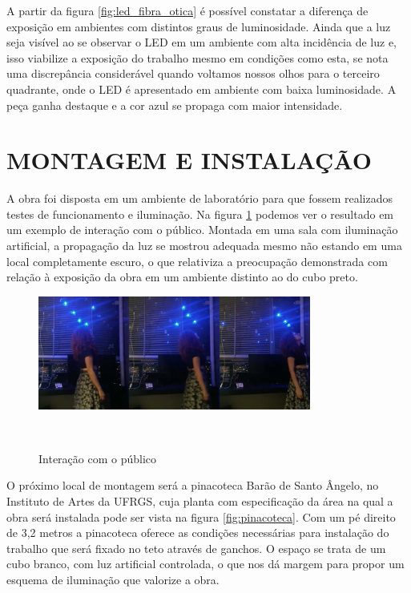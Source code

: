 A partir da figura \ref{fig:led_fibra_otica} é possível constatar a diferença de exposição em ambientes com distintos graus de luminosidade. Ainda que a luz seja visível ao se observar o LED em um ambiente com alta incidência de luz e, isso viabilize a exposição do trabalho mesmo em condições como esta, se nota uma discrepância considerável quando voltamos nossos olhos para o terceiro quadrante, onde o LED é apresentado em ambiente com baixa luminosidade. A peça ganha destaque e a cor azul se propaga com maior intensidade.

\section{MONTAGEM E INSTALAÇÃO}

A obra foi disposta em um ambiente de laboratório para que fossem realizados testes de funcionamento e iluminação. Na figura \ref{fig:trabalho} podemos ver o resultado em um exemplo de interação com o público. Montada em uma sala com iluminação artificial, a propagação da luz se mostrou adequada mesmo não estando em uma local completamente escuro, o que relativiza a preocupação demonstrada com relação à exposição da obra em um ambiente distinto ao do cubo preto.  
   
\begin{figure}[H]
  \begin{center}
    \caption{Interação com o público}
    \vspace*{0,2cm}
    \includegraphics[width=0.8\textwidth]{./04-figuras/trabalho}
    \label{fig:trabalho}
  \end{center}
  \vspace*{-0,9cm}
  \\
\end{figure}

O próximo local de montagem será a pinacoteca Barão de Santo Ângelo, no Instituto de Artes da UFRGS, cuja planta com especificação da área na qual a obra será instalada pode ser vista na figura \ref{fig:pinacoteca}. Com um pé direito de 3,2 metros a pinacoteca oferece as condições necessárias para instalação do trabalho que será fixado no teto através de ganchos. O espaço se trata de um cubo branco, com luz artificial controlada, o que nos dá margem para propor um esquema de iluminação que valorize a obra.

